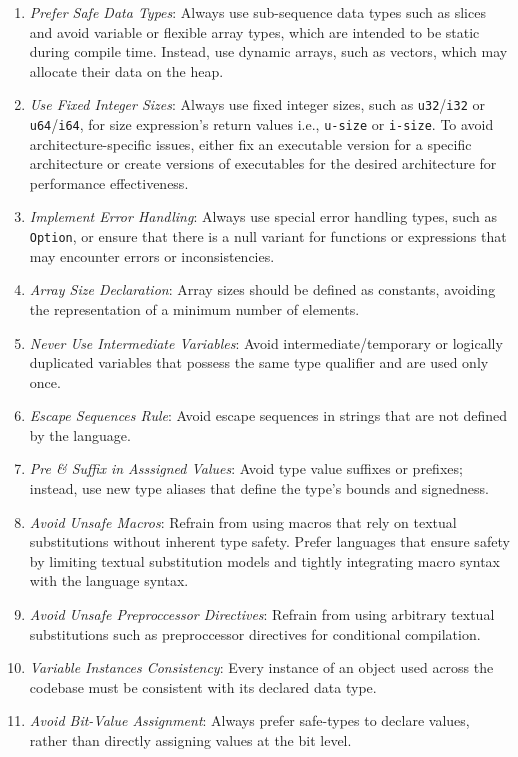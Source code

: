 \documentclass[9pt]{IEEEtran} %
\begin{document}
\begin{enumerate}
  \item \textit{Prefer Safe Data Types}: Always use sub-sequence data types such as slices and avoid variable or flexible array types, which are intended to be static during compile time. Instead, use dynamic arrays, such as vectors, which may allocate their data on the heap.
  \item \textit{Use Fixed Integer Sizes}: Always use fixed integer sizes, such as \texttt{u32}/\texttt{i32} or \texttt{u64}/\texttt{i64}, for size expression's return values i.e., \texttt{u-size} or \texttt{i-size}. To avoid architecture-specific issues, either fix an executable version for a specific architecture or create versions of executables for the desired architecture for performance effectiveness.
  \item \textit{Implement Error Handling}: Always use special error handling types, such as \texttt{Option}, or ensure that there is a null variant for functions or expressions that may encounter errors or inconsistencies.
  \item \textit{Array Size Declaration}: Array sizes should be defined as constants, avoiding the representation of a minimum number of elements.
  \item \textit{Never Use Intermediate Variables}: Avoid intermediate/temporary or logically duplicated variables that possess the same type qualifier and are used only once.
  \item \textit{Escape Sequences Rule}: Avoid escape sequences in strings that are not defined by the language.
  \item \textit{Pre \& Suffix in Asssigned Values}: Avoid type value suffixes or prefixes; instead, use new type aliases that define the type’s bounds and signedness.
  \item \textit{Avoid Unsafe Macros}: Refrain from using macros that rely on textual substitutions without inherent type safety. Prefer languages that ensure safety by limiting textual substitution models and tightly integrating macro syntax with the language syntax.
  \item \textit{Avoid Unsafe Preproccessor Directives}: Refrain from using arbitrary textual substitutions such as preproccessor directives for conditional compilation.
  \item \textit{Variable Instances Consistency}: Every instance of an object used across the codebase must be consistent with its declared data type.
  \item \textit{Avoid Bit-Value Assignment}: Always prefer safe-types to declare values, rather than directly assigning values at the bit level.

\end{enumerate}
\end{document}
